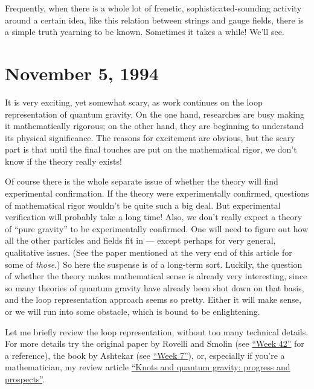 \documentclass[12pt]{article}
\def\tightlist{}
\renewcommand{\texttt}[1]{%
  \begingroup
  \ttfamily
  \begingroup\lccode`~=`/\lowercase{\endgroup\def~}{/\discretionary{}{}{}}%
  \begingroup\lccode`~=`[\lowercase{\endgroup\def~}{[\discretionary{}{}{}}%
  \begingroup\lccode`~=`.\lowercase{\endgroup\def~}{.\discretionary{}{}{}}%
  \catcode`/=\active\catcode`[=\active\catcode`.=\active
  \scantokens{#1\noexpand}%
  \endgroup
}
\begin{document}
\noindent
Frequently, when there is a whole lot of frenetic,
sophisticated-sounding activity around a certain idea, like this
relation between strings and gauge fields, there is a simple truth
yearning to be known. Sometimes it takes a while! We'll see.



\hypertarget{week43}{%
\section{November 5, 1994}\label{week43}}

It is very exciting, yet somewhat scary, as work continues on the loop
representation of quantum gravity. On the one hand, researches are busy
making it mathematically rigorous; on the other hand, they are beginning
to understand its physical significance. The reasons for excitement are
obvious, but the scary part is that until the final touches are put on
the mathematical rigor, we don't know if the theory really exists!

Of course there is the whole separate issue of whether the theory will
find experimental confirmation. If the theory were experimentally
confirmed, questions of mathematical rigor wouldn't be quite such a big
deal. But experimental verification will probably take a long time!
Also, we don't really expect a theory of ``pure gravity'' to be
experimentally confirmed. One will need to figure out how all the other
particles and fields fit in --- except perhaps for very general,
qualitative issues. (See the paper mentioned at the very end of this
article for some of \emph{those}.) So here the suspense is of a
long-term sort. Luckily, the question of whether the theory makes
mathematical sense is already very interesting, since so many theories
of quantum gravity have already been shot down on that basis, and the
loop representation approach seems so pretty. Either it will make sense,
or we will run into some obstacle, which is bound to be enlightening.

Let me briefly review the loop representation, without too many
technical details. For more details try the original paper by Rovelli
and Smolin (see \protect\hyperlink{week42}{``Week 42''} for a
reference), the book by Ashtekar (see \protect\hyperlink{week7}{``Week
7''}), or, especially if you're a mathematician, my review article
\href{http://math.ucr.edu/home/baez/knot.ps}{``Knots and quantum
gravity: progress and prospects''}.
\end{document}
